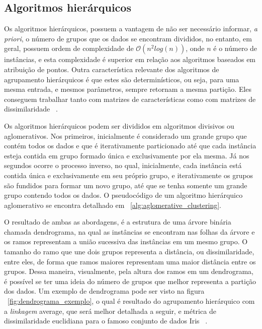 \subsection{Algoritmos hierárquicos}

Os algoritmos hierárquicos, possuem a vantagem de não ser necessário informar, \emph{a priori}, o número de grupos que os dados se encontram divididos, no entanto, em geral, possuem ordem de complexidade de  $\mathcal{O}(n^2log(n))$, onde $n$ é o número de instâncias, e esta complexidade é superior em relação aos algoritmos baseados em atribuição de pontos. Outra característica relevante dos algoritmos de agrupamento hierárquicos é que estes são determinísticos, ou seja, para uma mesma entrada, e mesmos parâmetros, sempre retornam a mesma partição. Eles conseguem trabalhar tanto com matrizes de características como com matrizes de dissimilaridade ~\parencite[][245]{Ullman}.

Os algoritmos hierárquicos podem ser divididos em algoritmos divisivos ou aglomerativos. Nos primeiros, inicialmente é considerado um grande grupo que contém todos os dados e que é iterativamente particionado até que cada instância esteja contida em grupo formado única e exclusivamente por ela mesma. Já nos segundos ocorre o processo inverso, no qual, inicialmente, cada instância está contida única e exclusivamente em seu próprio grupo, e iterativamente os grupos são fundidos para formar um novo grupo, até que se tenha somente um grande grupo contendo todos os dados. O pseudocódigo de um algoritmo hierárquico aglomerativo se encontra detalhado em ~\ref{alg:aglomerative_clustering}.

O resultado de ambas as abordagens, é a estrutura de uma árvore binária chamada dendrograma, na qual as instâncias se encontram nas folhas da árvore e os ramos representam a união sucessiva das instâncias em um mesmo grupo. O tamanho do ramo que une dois grupos representa a distância, ou dissimilaridade, entre eles, de forma que ramos maiores representam uma maior distância entre os grupos. Dessa maneira, visualmente, pela altura dos ramos em um dendrograma, é possível se ter uma ideia do número de grupos que melhor representa a partição dos dados. Um exemplo de dendrograma pode ser visto na figura ~\ref{fig:dendrograma_exemplo}, o qual é resultado do agrupamento hierárquico com a \emph{linkagem} average, que será melhor detalhada a seguir, e métrica de dissimilaridade euclidiana para o famoso conjunto de dados Iris ~\parencite{Iris}.

